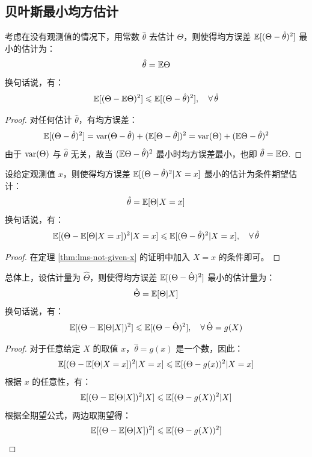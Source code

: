 \subsection{贝叶斯最小均方估计}

\begin{theorem}
\label{thm:lms-not-given-x}
考虑在没有观测值的情况下，用常数 $\hat\theta$ 去估计 $\Theta$，则使得均方误差 $\mathbb{E}[(\Theta-\hat\theta)^2]$ 最小的估计为：
\[\hat\theta=\mathbb{E}\Theta\]
换句话说，有：
\[
\mathbb{E}[(\Theta-\mathbb{E}\Theta)^2]\leqslant\mathbb{E}[(\Theta-\hat\theta)^2],\quad\forall\,\hat\theta
\]
\end{theorem}
\begin{proof}
对任何估计 $\hat\theta$，有均方误差：
\[
\mathbb{E}[(\Theta-\hat\theta)^2]=\mathrm{var}(\Theta-\hat\theta)+(\mathbb{E}[\Theta-\hat\theta])^2=\mathrm{var}(\Theta)+(\mathbb{E}\Theta-\hat\theta)^2
\]
由于 $\mathrm{var}(\Theta)$ 与 $\hat\theta$ 无关，故当 $(\mathbb{E}\Theta-\hat\theta)^2$ 最小时均方误差最小，也即 $\hat\theta=\mathbb{E}\Theta$.
\end{proof}

\begin{theorem}
\label{thm:lms-given-x}
设给定观测值 $x$，则使得均方误差 $\mathbb{E}[(\Theta-\hat\theta)^2\vert X=x]$ 最小的估计为条件期望估计：
\[\hat\theta=\mathbb{E}[\Theta\vert X=x]\]
换句话说，有：
\[
\mathbb{E}[(\Theta-\mathbb{E}[\Theta\vert X=x])^2\vert X=x]\leqslant\mathbb{E}[(\Theta-\hat\theta)^2\vert X=x],\quad\forall\,\hat\theta
\]
\end{theorem}
\begin{proof}
在定理 \ref{thm:lms-not-given-x} 的证明中加入 $X=x$ 的条件即可。
\end{proof}

\begin{theorem}
\label{thm:lms-overall}
总体上，设估计量为 $\hat\Theta$，则使得均方误差 $\mathbb{E}[(\Theta-\hat\Theta)^2]$ 最小的估计量为：
\[
\hat\Theta=\mathbb{E}[\Theta\vert X]
\]
换句话说，有：
\[
\mathbb{E}[(\Theta-\mathbb{E}[\Theta\vert X])^2]\leqslant \mathbb{E}[(\Theta-\hat\Theta)^2],\quad\forall\,\hat\Theta=g(X)
\]
\end{theorem}
\begin{proof}
对于任意给定 $X$ 的取值 $x$，$\hat\theta=g(x)$ 是一个数，因此：
\[
\mathbb{E}[(\Theta-\mathbb{E}[\Theta\vert X=x])^2\vert X=x]\leqslant\mathbb{E}[(\Theta-g(x))^2\vert X=x]
\]
根据 $x$ 的任意性，有：
\[
\mathbb{E}[(\Theta-\mathbb{E}[\Theta\vert X])^2\vert X]\leqslant\mathbb{E}[(\Theta-g(X))^2\vert X]
\]
根据全期望公式，两边取期望得：
\[
\mathbb{E}[(\Theta-\mathbb{E}[\Theta\vert X])^2]\leqslant\mathbb{E}[(\Theta-g(X))^2]
\]
\end{proof}

